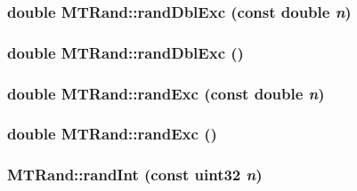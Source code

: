 \begin{CompactItemize}
\begin{CompactItemize}
\hypertarget{classMTRand_1a81d8f00de8f553d4b8626d64e1c544}{
\subsubsection[{randDblExc}]{\setlength{\rightskip}{0pt plus 5cm}double MTRand::randDblExc (const double {\em n})}}
\label{classMTRand_1a81d8f00de8f553d4b8626d64e1c544}


\hypertarget{classMTRand_4d3a475aa72fe6d1a6d7d9e16d6a732e}{
\subsubsection[{randDblExc}]{\setlength{\rightskip}{0pt plus 5cm}double MTRand::randDblExc ()}}
\label{classMTRand_4d3a475aa72fe6d1a6d7d9e16d6a732e}


\hypertarget{classMTRand_a1e89d6c7ac8737567b3ccf8fe70b6de}{
\subsubsection[{randExc}]{\setlength{\rightskip}{0pt plus 5cm}double MTRand::randExc (const double {\em n})}}
\label{classMTRand_a1e89d6c7ac8737567b3ccf8fe70b6de}


\hypertarget{classMTRand_fd05e468983b3a3d66ce0f403bd666af}{
\subsubsection[{randExc}]{\setlength{\rightskip}{0pt plus 5cm}double MTRand::randExc ()}}
\label{classMTRand_fd05e468983b3a3d66ce0f403bd666af}


\hypertarget{classMTRand_3515bbf6e1b46680a4ce6968451942b6}{
\subsubsection[{randInt}]{ MTRand::randInt (const {\bf uint32} {\em n})}}
\label{classMTRand_3515bbf6e1b46680a4ce6968451942b6}



\end{CompactItemize}
\end{CompactItemize}
